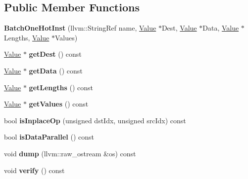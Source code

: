 \subsection*{Public Member Functions}
\begin{DoxyCompactItemize}
\item 
\mbox{\label{classglow_1_1_batch_one_hot_inst_ac297e91aedccf28e73c25bc6145f2055}} 
{\bfseries Batch\+One\+Hot\+Inst} (llvm\+::\+String\+Ref name, \hyperlink{classglow_1_1_value}{Value} $\ast$Dest, \hyperlink{classglow_1_1_value}{Value} $\ast$Data, \hyperlink{classglow_1_1_value}{Value} $\ast$Lengths, \hyperlink{classglow_1_1_value}{Value} $\ast$Values)
\item 
\mbox{\label{classglow_1_1_batch_one_hot_inst_af03601fd1c5e5616fda9eb94fbf25d84}} 
\hyperlink{classglow_1_1_value}{Value} $\ast$ {\bfseries get\+Dest} () const
\item 
\mbox{\label{classglow_1_1_batch_one_hot_inst_a91a0b692d656f0778db2df07fb2a28c8}} 
\hyperlink{classglow_1_1_value}{Value} $\ast$ {\bfseries get\+Data} () const
\item 
\mbox{\label{classglow_1_1_batch_one_hot_inst_a2406617e242619b91f4a89ce33711e97}} 
\hyperlink{classglow_1_1_value}{Value} $\ast$ {\bfseries get\+Lengths} () const
\item 
\mbox{\label{classglow_1_1_batch_one_hot_inst_a34e7a3055fa3487cd35f61c3d291bb1a}} 
\hyperlink{classglow_1_1_value}{Value} $\ast$ {\bfseries get\+Values} () const
\item 
\mbox{\label{classglow_1_1_batch_one_hot_inst_adc55902578bf32be569d8b29218e8468}} 
bool {\bfseries is\+Inplace\+Op} (unsigned dst\+Idx, unsigned src\+Idx) const
\item 
\mbox{\label{classglow_1_1_batch_one_hot_inst_ab91f68c05c9fac9471e7f4077af3acd8}} 
bool {\bfseries is\+Data\+Parallel} () const
\item 
\mbox{\label{classglow_1_1_batch_one_hot_inst_af181014f2bcae9defdad7c85955c9a2c}} 
void {\bfseries dump} (llvm\+::raw\+\_\+ostream \&os) const
\item 
\mbox{\label{classglow_1_1_batch_one_hot_inst_ae6957fc3550994c25e5f102f71a55b1d}} 
void {\bfseries verify} () const
\end{DoxyCompactItemize}
